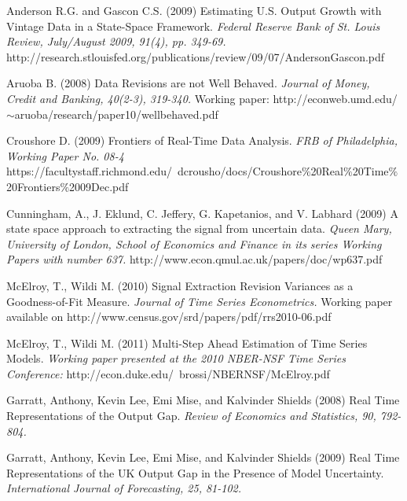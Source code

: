\documentclass[11pt]{article}
\begin{document}



%
\begin{thebibliography}{99}


\bibitem{} Anderson R.G. and Gascon C.S. (2009) Estimating U.S. Output Growth with
Vintage Data in a State-Space Framework. {\it
Federal Reserve Bank of St. Louis Review, July/August 2009, 91(4), pp. 349-69.} http://research.stlouisfed.org/publications/review/09/07/Anderson\textunderscore Gascon.pdf


\bibitem{} Aruoba B. (2008) Data Revisions are not Well Behaved. {\it
Journal of Money, Credit and Banking, 40(2-3), 319-340.} Working paper: http://econweb.umd.edu/$\sim$aruoba/research/paper10/well\textunderscore behaved.pdf


\bibitem{} Croushore D. (2009) Frontiers of Real-Time Data Analysis. {\it
FRB of Philadelphia, Working Paper No. 08-4} https://facultystaff.richmond.edu/~dcrousho/docs/Croushore$\%$20Real$\%$20Time$\%$20Frontiers$\%$2009Dec.pdf



\bibitem{} Cunningham, A., J. Eklund, C. Jeffery, G. Kapetanios, and V. Labhard (2009)  A state space approach to extracting the signal from uncertain
data. {\it
Queen Mary, University of London, School of Economics and Finance in its series Working Papers with number 637.} http://www.econ.qmul.ac.uk/papers/doc/wp637.pdf


\bibitem{} McElroy, T., Wildi M. (2010)  Signal
Extraction Revision Variances as a Goodness-of-Fit Measure. {\it
Journal of Time Series
Econometrics.} Working paper available on http://www.census.gov/srd/papers/pdf/rrs2010-06.pdf



\bibitem{} McElroy, T., Wildi M. (2011)  Multi-Step Ahead Estimation of Time Series Models. {\it
Working paper presented at the 2010 NBER-NSF Time Series Conference:} http://econ.duke.edu/~brossi/NBERNSF/McElroy.pdf



\bibitem{} Garratt, Anthony, Kevin Lee, Emi Mise, and Kalvinder Shields (2008)  Real Time
Representations of the Output Gap. {\it
Review of Economics and Statistics, 90, 792-804.}



\bibitem{} Garratt, Anthony, Kevin Lee, Emi Mise, and Kalvinder Shields (2009)  Real Time
Representations of the UK Output Gap in the Presence of Model Uncertainty. {\it
International
Journal of Forecasting, 25, 81-102.}






\end{thebibliography}
\end{document}
